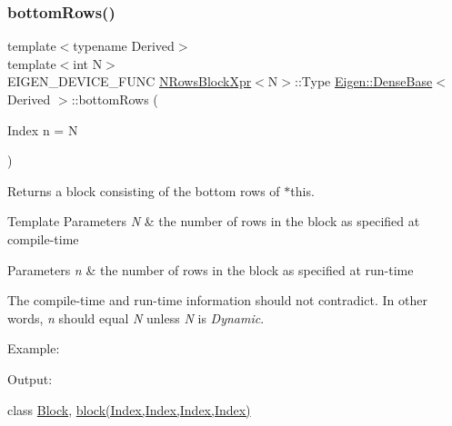 \subsubsection{\texorpdfstring{bottomRows()}{bottomRows()}\hspace{0.1cm}{\footnotesize\ttfamily [2/2]}}
{\footnotesize\ttfamily template$<$typename Derived$>$ \\
template$<$int N$>$ \\
E\+I\+G\+E\+N\+\_\+\+D\+E\+V\+I\+C\+E\+\_\+\+F\+U\+NC \mbox{\hyperlink{struct_eigen_1_1_dense_base_1_1_n_rows_block_xpr}{N\+Rows\+Block\+Xpr}}$<$N$>$\+::Type \mbox{\hyperlink{class_eigen_1_1_dense_base}{Eigen\+::\+Dense\+Base}}$<$ Derived $>$\+::bottom\+Rows (\begin{DoxyParamCaption}\item[{Index}]{n = {\ttfamily N} }\end{DoxyParamCaption})\hspace{0.3cm}{\ttfamily [inline]}}

\begin{DoxyReturn}{Returns}
a block consisting of the bottom rows of $\ast$this.
\end{DoxyReturn}

\begin{DoxyTemplParams}{Template Parameters}
{\em N} & the number of rows in the block as specified at compile-\/time \\
\hline
\end{DoxyTemplParams}

\begin{DoxyParams}{Parameters}
{\em n} & the number of rows in the block as specified at run-\/time\\
\hline
\end{DoxyParams}
The compile-\/time and run-\/time information should not contradict. In other words, {\itshape n} should equal {\itshape N} unless {\itshape N} is {\itshape Dynamic}.

Example\+: 
\begin{DoxyCodeInclude}{0}
\end{DoxyCodeInclude}
 Output\+: 
\begin{DoxyVerbInclude}
\end{DoxyVerbInclude}
 class \mbox{\hyperlink{class_eigen_1_1_block}{Block}}, \mbox{\hyperlink{class_eigen_1_1_dense_base_ab8e42e67c5cfd5fa13e684642f0f65bf}{block(\+Index,\+Index,\+Index,\+Index)}} \mbox{\label{class_eigen_1_1_dense_base_a469583ed90462820888344e63ebe1a80}} 
